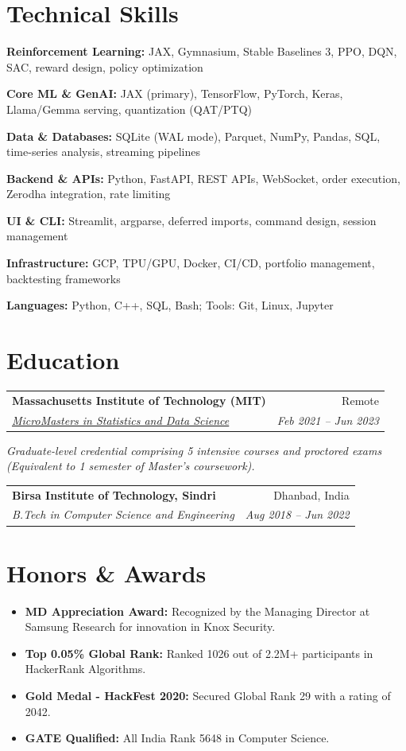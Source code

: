\documentclass[10pt, letterpaper]{article}
\makeatletter
\newcommand{\resumeItem}[1]{
  \item\small{
    {#1 \vspace{-2pt}}
  }
}
\newcommand{\resumeSubheading}[4]{
  \vspace{-1pt}\item
    \begin{tabular*}{0.98\textwidth}[t]{l@{\extracolsep{\fill}}r}
      \textbf{#1} & {\small\color{darkgray} #2} \\
      \textit{\small#3} & \textit{\small\color{darkgray} #4} \\
    \end{tabular*}\vspace{-7pt}
}
\newcommand{\resumeSubHeadingListStart}{\begin{itemize}[leftmargin=0.15in, label={}]}
\newcommand{\resumeSubHeadingListEnd}{\end{itemize}}
\makeatother
\begin{document}
\section{Technical Skills}
 \begin{itemize}[leftmargin=0.12in, label={}]
    \small{\item{\textbf{Reinforcement Learning:} JAX, Gymnasium, Stable Baselines 3, PPO, DQN, SAC, reward design, policy optimization}}
    \small{\item{\textbf{Core ML \& GenAI:} JAX (primary), TensorFlow, PyTorch, Keras, Llama/Gemma serving, quantization (QAT/PTQ)}}
    \small{\item{\textbf{Data \& Databases:} SQLite (WAL mode), Parquet, NumPy, Pandas, SQL, time-series analysis, streaming pipelines}}
    \small{\item{\textbf{Backend \& APIs:} Python, FastAPI, REST APIs, WebSocket, order execution, Zerodha integration, rate limiting}}
    \small{\item{\textbf{UI \& CLI:} Streamlit, argparse, deferred imports, command design, session management}}
    \small{\item{\textbf{Infrastructure:} GCP, TPU/GPU, Docker, CI/CD, portfolio management, backtesting frameworks}}
    \small{\item{\textbf{Languages:} Python, C++, SQL, Bash; Tools: Git, Linux, Jupyter}}
 \end{itemize}

\section{Education}
  \resumeSubHeadingListStart
    \resumeSubheading
      {Massachusetts Institute of Technology (MIT)}{Remote}
      {\href{https://micromasters.mit.edu/ds}{MicroMasters in Statistics and Data Science}}{Feb 2021 -- Jun 2023}
      \vspace{-4pt}
      \small{\item{\textit{Graduate-level credential comprising 5 intensive courses and proctored exams (Equivalent to 1 semester of Master's coursework).}}}
    \resumeSubheading
      {Birsa Institute of Technology, Sindri}{Dhanbad, India}
      {B.Tech in Computer Science and Engineering}{Aug 2018 -- Jun 2022}
  \resumeSubHeadingListEnd

\section{Honors \& Awards}
  \resumeSubHeadingListStart
    \resumeItem{\textbf{MD Appreciation Award:} Recognized by the Managing Director at Samsung Research for innovation in Knox Security.}
    \resumeItem{\textbf{Top 0.05\% Global Rank:} Ranked 1026 out of 2.2M+ participants in HackerRank Algorithms.}
    \resumeItem{\textbf{Gold Medal - HackFest 2020:} Secured Global Rank 29 with a rating of 2042.}
    \resumeItem{\textbf{GATE Qualified:} All India Rank 5648 in Computer Science.}
  \resumeSubHeadingListEnd
\end{document}
